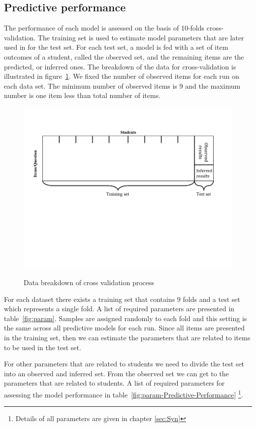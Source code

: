 \subsection{Predictive performance}

The performance of each model is assessed on the basis of 10-folds cross-validation.  The training set is used to estimate model parameters that are later used in for the test set. For each test set, a model is fed with a set of item outcomes of a student, called the observed set, and the remaining items are the predicted, or inferred ones. The breakdown of the data for cross-validation is illustrated in figure~\ref{figMethod}. We fixed the number of observed items for each run on each data set. The minimum number of observed items is 9 and the maximum number is one item less than total number of items. 

\begin{figure}[h]
\centering
{\includegraphics[trim=1cm 9cm 2.4cm 2.4cm,clip=true,width=.7\textwidth]{Images/Methodology.pdf}}
\caption{Data breakdown of cross validation process}
\label{figMethod}
\end{figure}

For each dataset there exists a training set that contains 9 folds and a test set which represents a single fold. A list of required parameters are presented in table~\ref{fig:param}. Samples are assigned randomly to each fold and this setting is the same across all predictive models for each run. Since all items are presented in the training set, then we can estimate the parameters that are related to items to be used in the test set. 



For other parameters that are related to students we need to divide the test set into an observed and inferred set. From the observed set we can get to the parameters that are related to students. A list of required parameters for assessing the model performance in table~\ref{fig:param-Predictive-Performance} \footnote{Details of all parameters are given in chapter \ref{sec:Syn}}.

